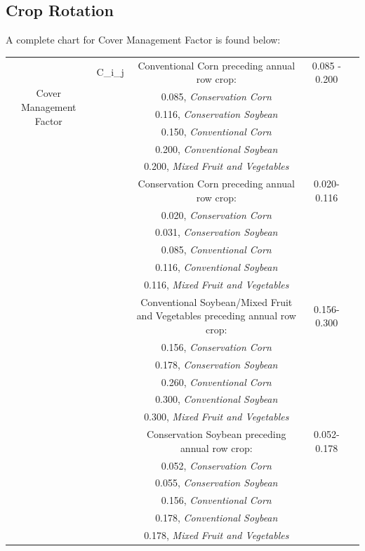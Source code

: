 \documentclass[11pt]{article}
\begin{document}
\subsection{Crop Rotation}
A complete chart for Cover Management Factor is found below:
\begin{center}
\begin{tabular}{ |c|c|c|c|c| } 
\hline
\multirow{5}{3em}{Cover Management Factor} & C_i_j & Conventional Corn preceding annual row crop: & 0.085 - 0.200 \\ 
& & 0.085, \textit{Conservation Corn} & \\ 
& & 0.116, \textit{Conservation Soybean} & \\ 
& & 0.150, \textit{Conventional Corn} & \\
& & 0.200, \textit{Conventional Soybean}  & \\
& & 0.200, \textit{Mixed Fruit and Vegetables} & \\
& & Conservation Corn preceding annual row crop:  & 0.020-0.116\\
& & 0.020, \textit{Conservation Corn}  & \\
& & 0.031, \textit{Conservation Soybean} & \\
& & 0.085, \textit{Conventional Corn} & \\
& & 0.116, \textit{Conventional Soybean} & \\
& & 0.116, \textit{Mixed Fruit and Vegetables} & \\
& & Conventional Soybean/Mixed Fruit and Vegetables 
preceding annual row crop: & 0.156-0.300\\
& & 0.156, \textit{Conservation Corn} & \\
& & 0.178, \textit{Conservation Soybean} & \\
& & 0.260, \textit{Conventional Corn} & \\
& & 0.300, \textit{Conventional Soybean} & \\
& & 0.300, \textit{Mixed Fruit and Vegetables} & \\
& & Conservation Soybean preceding annual row crop: & 0.052-0.178\\
& & 0.052, \textit{Conservation Corn} & \\
& & 0.055, \textit{Conservation Soybean} & \\
& & 0.156, \textit{Conventional Corn} & \\
& & 0.178, \textit{Conventional Soybean} & \\
& & 0.178, \textit{Mixed Fruit and Vegetables} & \\

\hline
\end{tabular}
\end{center}
\end{document}
